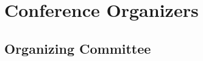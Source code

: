 \titleformat{\chapter}{\bf \huge}{\thechapter}{1cm}{}

\chapter{Conference Organizers}

\vspace{-2cm}
\section{Organizing Committee}

